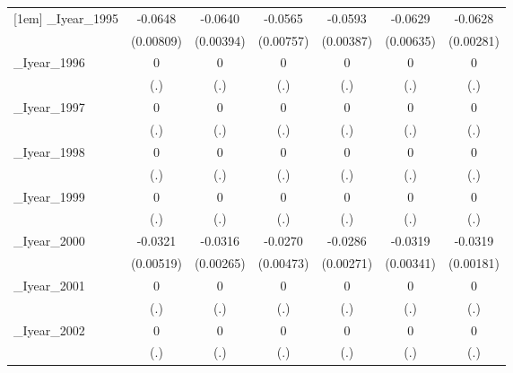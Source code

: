 \begin{table}[htbp]
\begin{tabular}{l*{6}{c}}
[1em]
\_Iyear\_1995&  -0.0648\sym{***}&  -0.0640\sym{***}&  -0.0565\sym{***}&  -0.0593\sym{***}&  -0.0629\sym{***}&  -0.0628\sym{***}\\
          &(0.00809)         &(0.00394)         &(0.00757)         &(0.00387)         &(0.00635)         &(0.00281)         \\
[1em]
\_Iyear\_1996&        0         &        0         &        0         &        0         &        0         &        0         \\
          &      (.)         &      (.)         &      (.)         &      (.)         &      (.)         &      (.)         \\
[1em]
\_Iyear\_1997&        0         &        0         &        0         &        0         &        0         &        0         \\
          &      (.)         &      (.)         &      (.)         &      (.)         &      (.)         &      (.)         \\
[1em]
\_Iyear\_1998&        0         &        0         &        0         &        0         &        0         &        0         \\
          &      (.)         &      (.)         &      (.)         &      (.)         &      (.)         &      (.)         \\
[1em]
\_Iyear\_1999&        0         &        0         &        0         &        0         &        0         &        0         \\
          &      (.)         &      (.)         &      (.)         &      (.)         &      (.)         &      (.)         \\
[1em]
\_Iyear\_2000&  -0.0321\sym{***}&  -0.0316\sym{***}&  -0.0270\sym{***}&  -0.0286\sym{***}&  -0.0319\sym{***}&  -0.0319\sym{***}\\
          &(0.00519)         &(0.00265)         &(0.00473)         &(0.00271)         &(0.00341)         &(0.00181)         \\
[1em]
\_Iyear\_2001&        0         &        0         &        0         &        0         &        0         &        0         \\
          &      (.)         &      (.)         &      (.)         &      (.)         &      (.)         &      (.)         \\
[1em]
\_Iyear\_2002&        0         &        0         &        0         &        0         &        0         &        0         \\
          &      (.)         &      (.)         &      (.)         &      (.)         &      (.)         &      (.)         \\

\end{tabular}
\end{table}
